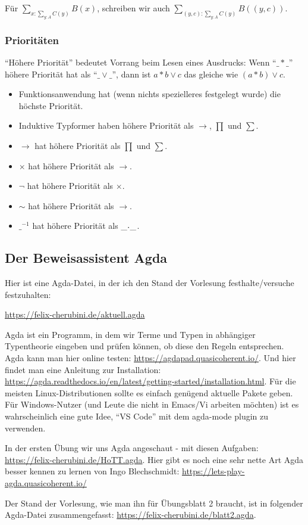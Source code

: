 Für $\sum_{x:\sum_{y:A}C(y)}B(x)$, 
schreiben wir auch $\sum_{(y,c):\sum_{y:A}C(y)}B((y,c))$.

\subsubsection{Prioritäten}
``Höhere Priorität'' bedeutet Vorrang beim Lesen eines Ausdrucks: Wenn ``$\_\ast\_$'' höhere Priorität hat als ``$\_\vee\_$'', dann ist $a\ast b \vee c$ das gleiche wie $(a\ast b) \vee c$.

\begin{itemize}
\item Funktionsanwendung hat (wenn nichts spezielleres festgelegt wurde) die höchste Priorität.
\item Induktive Typformer haben höhere Priorität als $\to$, $\prod$ und $\sum$.
\item $\to$ hat höhere Priorität als $\prod$ und $\sum$.
\item $\times$ hat höhere Priorität als $\to$.
\item $\neg$ hat höhere Priorität als $\times$.
\item $\sim$ hat höhere Priorität als $\to$.
\item $\_^{-1}$ hat höhere Priorität als $\_\kon\_$.
\end{itemize}

\subsection{Der Beweisassistent Agda}
Hier ist eine Agda-Datei, in der ich den Stand der Vorlesung festhalte/versuche festzuhalten:
\begin{center}
  \url{https://felix-cherubini.de/aktuell.agda}
\end{center}

Agda ist ein Programm, in dem wir Terme und Typen in abhängiger Typentheorie eingeben und prüfen können, ob diese den Regeln entsprechen. Agda kann man hier online testen: \url{https://agdapad.quasicoherent.io/}. Und hier findet man eine Anleitung zur Installation: \url{https://agda.readthedocs.io/en/latest/getting-started/installation.html}. Für die meisten Linux-Distributionen sollte es einfach genügend aktuelle Pakete geben. Für Windows-Nutzer (und Leute die nicht in Emacs/Vi arbeiten möchten) ist es wahrscheinlich eine gute Idee, ``VS Code'' mit dem agda-mode plugin zu verwenden.

In der ersten Übung wir uns Agda angeschaut - mit diesen Aufgaben: \url{https://felix-cherubini.de/HoTT.agda}.
Hier gibt es noch eine sehr nette Art Agda besser kennen zu lernen von Ingo Blechschmidt:
\url{https://lets-play-agda.quasicoherent.io/}

Der Stand der Vorlesung, wie man ihn für Übungsblatt 2 braucht, ist in folgender Agda-Datei zusammengefasst: \url{https://felix-cherubini.de/blatt2.agda}.
